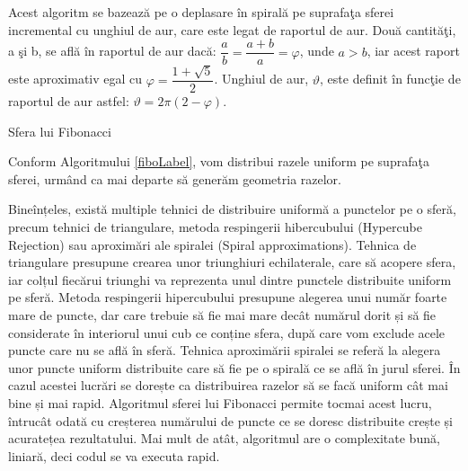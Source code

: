 	Acest algoritm se bazeaz\u{a} pe o deplasare \^{i}n spiral\u{a} pe suprafa\c{t}a sferei incremental cu unghiul de aur, care este legat de raportul de aur. Dou\u{a} cantit\u{a}\c{t}i, a \c{s}i b, se afl\u{a} \^{i}n raportul de aur dac\u{a}: $\dfrac{a}{b} = \dfrac{a+b}{a} = \varphi$, unde $a>b$, iar acest raport este aproximativ egal cu $\varphi = \dfrac{1+\sqrt{5}}{2}$. Unghiul de aur, $\vartheta$, este definit \^{i}n func\c{t}ie de raportul de aur astfel: $\vartheta = 2\pi(2- \varphi)$. 
	 
	
	\begin{algorithm}
		\caption{Sfera lui Fibonacci}
		\label{fiboLabel}
	\begin{algorithmic}[1]	
		
		\EndFor
		\EndProcedure
	\end{algorithmic}
	\end{algorithm}

	Conform Algoritmului \ref{fiboLabel}, vom distribui razele uniform pe suprafa\c{t}a sferei, urm\^{a}nd ca mai departe s\u{a} gener\u{a}m geometria razelor. 
	
	Bineînțeles, există multiple tehnici de distribuire uniformă a punctelor pe o sferă, precum tehnici de triangulare, metoda respingerii hibercubului (Hypercube Rejection) sau aproximări ale spiralei (Spiral approximations). Tehnica de triangulare presupune crearea unor triunghiuri echilaterale, care să acopere sfera, iar colțul fiecărui triunghi va reprezenta unul dintre punctele distribuite uniform pe sferă. Metoda respingerii hipercubului presupune alegerea unui număr foarte mare de puncte, dar care trebuie să fie mai mare decât numărul dorit și să fie considerate în interiorul unui cub ce conține sfera, după care vom exclude acele puncte care nu se află în sferă. Tehnica aproximării spiralei se referă la alegera unor puncte uniform distribuite care să fie pe o spirală ce se află în jurul sferei. În cazul acestei lucrări se dorește ca distribuirea razelor să se facă uniform cât mai bine și mai rapid. Algoritmul sferei lui Fibonacci permite tocmai acest lucru, întrucât odată cu creșterea numărului de puncte ce se doresc distribuite crește și acuratețea rezultatului. Mai mult de atât, algoritmul are o complexitate bună, liniară, deci codul se va executa rapid.
		
